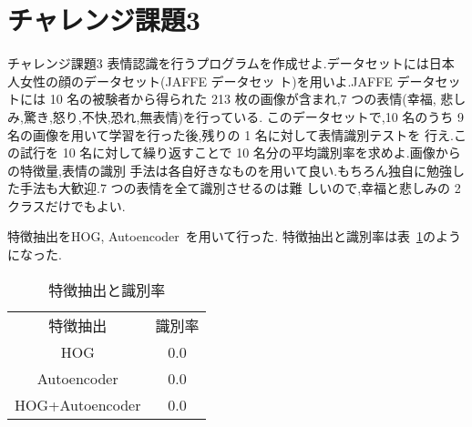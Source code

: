 \section{チャレンジ課題3}\label{section:challenge3}
\begin{itembox}{チャレンジ課題3}
  表情認識を行うプログラムを作成せよ.データセットには日本人女性の顔のデータセット(JAFFE データセッ ト)を用いよ.JAFFE データセットには 10 名の被験者から得られた 213 枚の画像が含まれ,7 つの表情(幸福, 悲しみ,驚き,怒り,不快,恐れ,無表情)を行っている.
  このデータセットで,10 名のうち 9 名の画像を用いて学習を行った後,残りの 1 名に対して表情識別テストを 行え.この試行を 10 名に対して繰り返すことで 10 名分の平均識別率を求めよ.画像からの特徴量,表情の識別 手法は各自好きなものを用いて良い.もちろん独自に勉強した手法も大歓迎.7 つの表情を全て識別させるのは難 しいので,幸福と悲しみの 2 クラスだけでもよい.
\end{itembox}

特徴抽出をHOG, Autoencoder~\cite{autoencoder}を用いて行った.
特徴抽出と識別率は表~\ref{tbl:feature-extraction-score}のようになった.

\begin{table}[htbp]
  \begin{center}
    \begin{tabular}{cc}
      特徴抽出 & 識別率 \\
      HOG & 0.0  \\
      Autoencoder & 0.0 \\
      HOG+Autoencoder & 0.0  \\
    \end{tabular}
    \caption{特徴抽出と識別率}
    \label{tbl:feature-extraction-score}
  \end{center}
\end{table}

